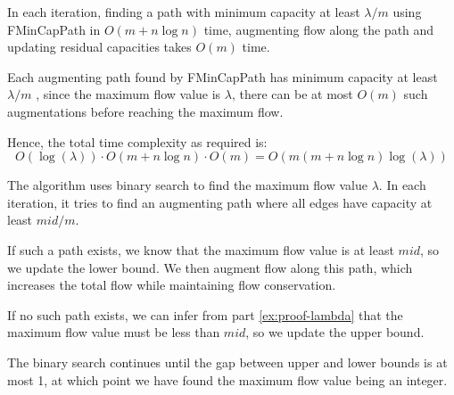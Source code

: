 \documentclass{article}
\begin{document}
\begin{solution}
\begin{subproof}[Runtime]
In each iteration, finding a path with minimum capacity at least $\lambda/m$ using FMinCapPath in $O(m + n\log n)$ time, augmenting flow along the path and updating residual capacities takes $O(m)$ time.

Each augmenting path found by FMinCapPath has minimum capacity at least $\lambda/m$ , since the maximum flow value is $\lambda$, there can be at most $O(m)$ such augmentations before reaching the maximum flow.

Hence, the total time complexity as required is:
\[
O(\log(\lambda)) \cdot O(m + n\log n) \cdot O(m) = O(m(m + n\log n)\log(\lambda))
\]

\end{subproof}

\begin{subproof}[Correctness]
The algorithm uses binary search to find the maximum flow value $\lambda$. In each iteration, it tries to find an augmenting path where all edges have capacity at least $mid/m$.

If such a path exists, we know that the maximum flow value is at least $mid$, so we update the lower bound. We then augment flow along this path, which increases the total flow while maintaining flow conservation.

If no such path exists, we can infer from part \ref{ex:proof-lambda} that the maximum flow value must be less than $mid$, so we update the upper bound.

The binary search continues until the gap between upper and lower bounds is at most 1, at which point we have found the maximum flow value being an integer.
\end{subproof}
\end{solution}
\pagebreak
\end{document}
